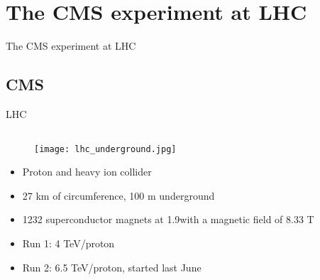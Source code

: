 \section[CMS]{The CMS experiment at LHC}
\setcounter{tocdepth}{2}

\begin{frame}{}
The CMS experiment at LHC
\end{frame}

\subsection{CMS}

\begin{frame}{LHC}
\vspace{-.2cm}

\begin{columns}
\begin{column}{.50\textwidth}
\begin{figure}[!Hhtbp]
  \begin{center}
    \texttt{[image: lhc\_underground.jpg]}
  \end{center}
\end{figure}
\vspace{-.2cm}
\begin{block}{}
\begin{itemize}\scriptsize
\item Proton and heavy ion collider
\item 27 km of circumference, 100 m underground
\item 1232 superconductor magnets at 1.9\textdegree with a magnetic field of 8.33 T
\item Run 1: 4 TeV/proton
\item Run 2: 6.5 TeV/proton, started last June
\end{itemize}
\end{block}
\end{column}


\end{columns}
\end{frame}

